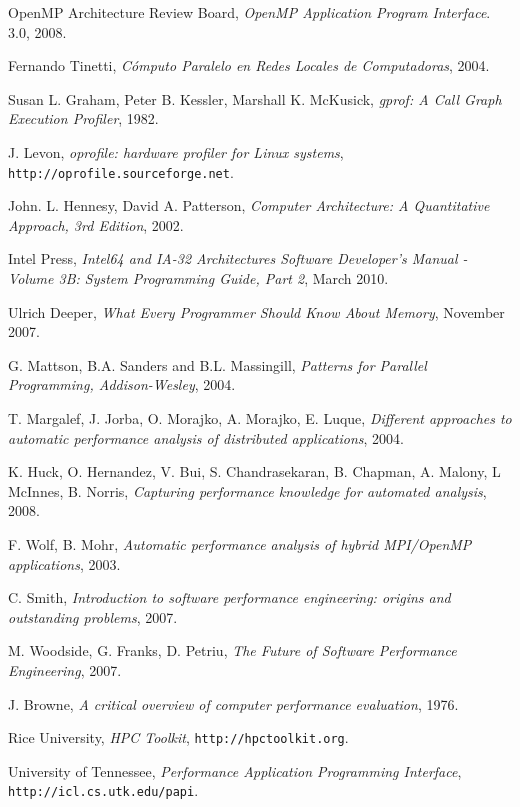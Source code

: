 \documentclass[a4paper]{article}
\begin{document}
\begin{thebibliography}{9}
  
  OpenMP Architecture Review Board,
  \emph{OpenMP Application Program Interface}.
  3.0,
  2008.

  Fernando Tinetti,
  \emph{C\'omputo Paralelo en Redes Locales de Computadoras},
  2004.

 Susan L. Graham,  Peter B. Kessler,  Marshall K. McKusick,
 \emph{gprof: A Call Graph Execution Profiler},
 1982.

J. Levon,
\emph{oprofile: hardware profiler for Linux systems},
{\tt http://oprofile.sourceforge.net}.

 John. L. Hennesy, David A. Patterson,
 \emph{Computer Architecture: A Quantitative Approach, 3rd Edition},
 2002.

 Intel Press,
 \emph{Intel64 and IA-32 Architectures Software Developer's Manual - Volume 3B: System Programming Guide, Part 2},
 March 2010.

 Ulrich Deeper,
 \emph{What Every Programmer Should Know About Memory},
 November 2007.

 G. Mattson, B.A. Sanders and B.L. Massingill, 
 \emph{Patterns for Parallel Programming, Addison-Wesley},
 2004.

 T. Margalef, J. Jorba, O. Morajko, A. Morajko, E. Luque,
 \emph{Different approaches to automatic performance analysis of distributed applications},
 2004.

 K. Huck, O. Hernandez, V. Bui, S. Chandrasekaran, B. Chapman, A. Malony, L McInnes, B. Norris,
 \emph{Capturing performance knowledge for automated analysis},
 2008.

 F. Wolf, B. Mohr,
 \emph{Automatic performance analysis of hybrid MPI/OpenMP applications},
 2003.

 C. Smith,
 \emph{Introduction to software performance engineering: origins and outstanding problems},
 2007.

 M. Woodside, G. Franks, D. Petriu,
 \emph{The Future of Software Performance Engineering},
 2007.

 J. Browne,
 \emph{A critical overview of computer performance evaluation},
 1976.

  Rice University,
 \emph{HPC Toolkit},
 {\tt http://hpctoolkit.org}.

  University of Tennessee,
  \emph{Performance Application Programming Interface},
  {\tt http://icl.cs.utk.edu/papi}.


\end{thebibliography}
\end{document}
